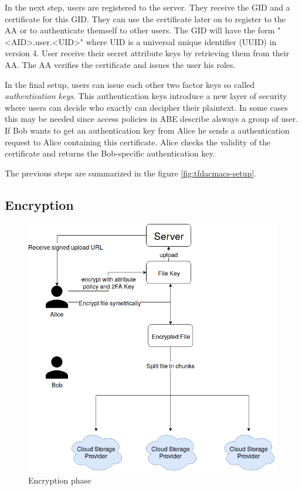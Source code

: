 In the next step, users are registered to the server. They receive the GID and a certificate for this GID. They can use the certificate later on to register to the AA or to authenticate themself to other users. The GID will have the form "<AID>.user.<UID>" where UID is a universal unique identifier (\ac{UUID}) in version 4.  
User receive their secret attribute keys by retrieving them from their AA. The AA verifies the certificate and issues the user his roles.

In the final setup, users can issue each other two factor keys so called \textit{authentication keys}. This authentication keys introduce a new layer of security where users can decide who exactly can decipher their plaintext. In some cases this may be needed since access policies in ABE describe alsways a group of user. 
If Bob wants to get an authentication key from Alice he sends a authentication request to Alice containing this certificate. Alice checks the validity of the certificate and returns the Bob-specific authentication key.

The previous steps are summarized in the figure \ref{fig:tfdacmacs-setup}.

\subsection{Encryption}
\begin{figure}[!t]
\centering
    \includegraphics[width=\linewidth]{img/TF-DAC-MACS-overview-encrypt.png}
    \caption{Encryption phase}
    \label{fig:tfdacmacs-encrypt}
\end{figure}

